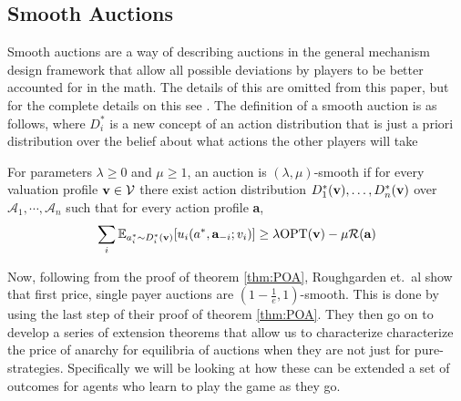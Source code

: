 \documentclass[12pt,twoside]{reedthesis}
\begin{document}
\subsection{Smooth Auctions}

Smooth auctions are a way of describing auctions in the general mechanism design framework that allow all possible deviations by players to be better accounted for in the math. The details of this are omitted from this paper, but for the complete details on this see \citet{Roughgarden2017}. The definition of a smooth auction is as follows, where $D^*_i$ is a new concept of an action distribution that is just a priori distribution over the belief about what actions the other players will take 

\begin{dfn}
	For parameters $\lambda \geq 0$ and $\mu \geq 1$, an auction is $(\lambda, \mu)$-smooth if for every valuation profile $\textbf{v} \in \mathcal{V}$ there exist action distribution $D_1^{*}(\textbf{v}), \ldots , D_n^*(\textbf{v})$ over $\mathcal{A}_1, \cdots, \mathcal{A}_n$ such that for every action profile \textbf{a},
	$$ \sum_i \mathbb{E}_{a_i^* \sim D_i^*(\textbf{v})}[u_i(a^*, \textbf{a}_{-i};v_i)] \geq \lambda \text{OPT}(\textbf{v}) - \mu \mathcal{R}(\textbf{a})$$
\end{dfn}

 Now, following from the proof of theorem \ref{thm:POA}, Roughgarden et.~al show that first price, single payer auctions are $(1-\frac{1}{e}, 1)$-smooth. This is done by using the last step of their proof of theorem \ref{thm:POA}. They then go on to develop a series of extension theorems that allow us to characterize characterize the price of anarchy for equilibria of auctions when they are not just for pure-strategies. Specifically we will be looking at how these can be extended a set of outcomes for agents who learn to play the game as they go.

\end{document}
